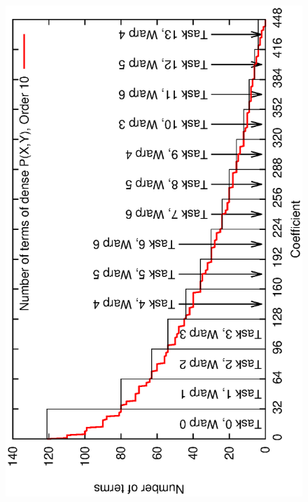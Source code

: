 \documentclass[oribibl,a4paper]{llncs2e/llncs}
\begin{document}
\begin{figure}[t]
    \centering
    \mbox{
        \includegraphics[scale=0.37, angle=-90]{coeffs.eps} 
}
\end{figure}
\end{document}
